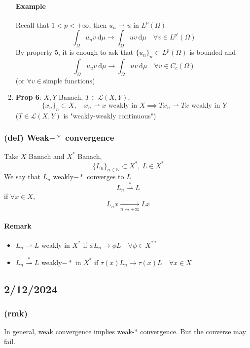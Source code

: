 \begin{enumerate}
    \paragraph{Example}
    Recall that $1< p<+\infty$, then $u_n\rightharpoonup u$ in $L^p(\Omega)$
    $$\int_{\Omega}u_n v\ \mathrm d\mu\to \int_{\Omega}uv\ \mathrm d\mu \quad \forall v\in L^{p'}(\Omega)$$
    By property 5, it is enough to ask that $\{u_n\}_n\subset L^p(\Omega)$ is bounded and $$\int_\Omega u_uv\ \mathrm d\mu\to \int_\Omega uv\ \mathrm d\mu \quad \forall v \in C_c(\Omega)$$ 
    (or $\forall v\in \text{simple functions}$)
    \item \textbf{Prop 6}: $X,Y$ Banach, $T\in \mathcal L(X,Y)$,
    $$\{x_n\}_n\subset X, \quad x_n\rightharpoonup x \text{ weakly in }X\implies Tx_n\rightharpoonup Tx\text{ weakly in }Y$$
    ($T\in \mathcal L(X,Y)$ is "weakly-weakly continuous")
    
    
\end{enumerate}


\subsubsection{(def) Weak$-*$ convergence}
Take $X$ Banach and $X^*$ Banach,
$$\{L_n\}_{n\in \mathbb N}\subset X^*, \ L\in X^*$$
We say that $L_n$ weakly$-*$ converges to $L$
$$L_n\stackrel{\ast}{\rightharpoonup}L$$
if $\forall x\in X$,
$$L_nx\xrightarrow[n\to +\infty]{} Lx$$
\paragraph{Remark}
\begin{itemize}
    \item $L_n\rightharpoonup L$ weakly in $X^*$ if $\phi L_n\to \phi L\quad \forall \phi \in X^{**}$
    \item $L_n\stackrel{\ast}{\rightharpoonup} L$ weakly$-*$ in $X^*$ if $\tau (x)L_n\to \tau (x)L\quad \forall x\in X$
\end{itemize}

\subsection{2/12/2024}
\subsubsection{(rmk)}
In general, weak convergence implies weak-$*$ convergence. But the converse may fail.

